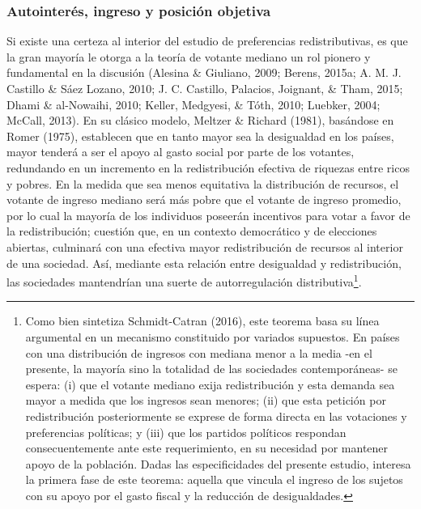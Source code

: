 \documentclass[12pt,letterpaper]{article}
\begin{document}
\subsubsection{Autointerés, ingreso y posición objetiva \label{sec:sec211}}

Si existe una certeza al interior del estudio de preferencias redistributivas, es que la gran mayoría le otorga a la teoría de votante mediano un rol pionero y fundamental en la discusión (Alesina \& Giuliano, 2009; Berens, 2015a; A. M. J. Castillo \& Sáez Lozano, 2010; J. C. Castillo, Palacios, Joignant, \& Tham, 2015; Dhami \& al-Nowaihi, 2010; Keller, Medgyesi, \& Tóth, 2010; Luebker, 2004; McCall, 2013). En su clásico modelo, Meltzer \& Richard (1981), basándose en Romer (1975), establecen que en tanto mayor sea la desigualdad en los países, mayor tenderá a ser el apoyo al gasto social por parte de los votantes, redundando en un incremento en la redistribución efectiva de riquezas entre ricos y pobres. En la medida que sea menos equitativa la distribución de recursos, el votante de ingreso mediano será más pobre que el votante de ingreso promedio, por lo cual la mayoría de los individuos poseerán incentivos para votar a favor de la redistribución; cuestión que, en un contexto democrático y de elecciones abiertas, culminará con una efectiva mayor redistribución de recursos al interior de una sociedad. Así, mediante esta relación entre desigualdad y redistribución, las sociedades mantendrían una suerte de autorregulación distributiva\footnote{Como bien sintetiza Schmidt-Catran (2016), este teorema basa su línea argumental en un mecanismo constituido por variados supuestos. En países con una distribución de ingresos con mediana menor a la media -en el presente, la mayoría sino la totalidad de las sociedades contemporáneas- se espera: (i) que el votante mediano exija redistribución y esta demanda sea mayor a medida que los ingresos sean menores; (ii) que esta petición por redistribución posteriormente se exprese de forma directa en las votaciones y preferencias políticas; y (iii) que los partidos políticos respondan consecuentemente ante este requerimiento, en su necesidad por mantener apoyo de la población. Dadas las especificidades del presente estudio, interesa la primera fase de este teorema: aquella que vincula el ingreso de los sujetos con su apoyo por el gasto fiscal y la reducción de desigualdades.}.\\
\end{document}
